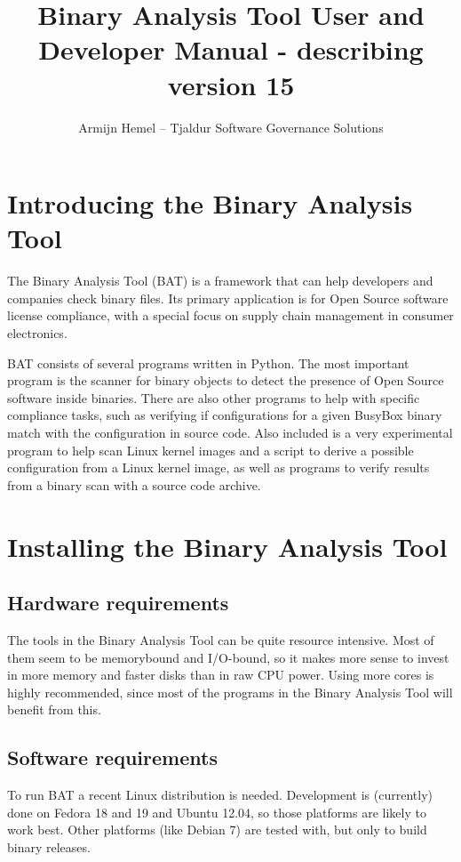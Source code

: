 \documentclass[10pt]{article}
\author{Armijn Hemel -- Tjaldur Software Governance Solutions}
\title{Binary Analysis Tool User and Developer Manual - describing version 15}
\begin{document}
\maketitle
\thispagestyle{empty}

\section{Introducing the Binary Analysis Tool}

The Binary Analysis Tool (BAT) is a framework that can help developers and
companies check binary files. Its primary application is for Open Source
software license compliance, with a special focus on supply chain management
in consumer electronics.

BAT consists of several programs written in Python. The most important program
is the scanner for binary objects to detect the presence of Open Source
software inside binaries. There are also other programs to help with specific
compliance tasks, such as verifying if configurations for a given BusyBox
binary match with the configuration in source code. Also included is a very
experimental program to help scan Linux kernel images and a script to derive a
possible configuration from a Linux kernel image, as well as programs to verify
results from a binary scan with a source code archive.

\section{Installing the Binary Analysis Tool}

\subsection{Hardware requirements}

The tools in the Binary Analysis Tool can be quite resource intensive. Most of
them seem to be memorybound and I/O-bound, so it makes more sense to invest
in more memory and faster disks than in raw CPU power. Using more cores is
highly recommended, since most of the programs in the Binary Analysis Tool will
benefit from this.

\subsection{Software requirements}

To run BAT a recent Linux distribution is needed. Development is (currently)
done on Fedora 18 and 19 and Ubuntu 12.04, so those platforms are likely to
work best. Other platforms (like Debian 7) are tested with, but only to
build binary releases.
\end{document}
